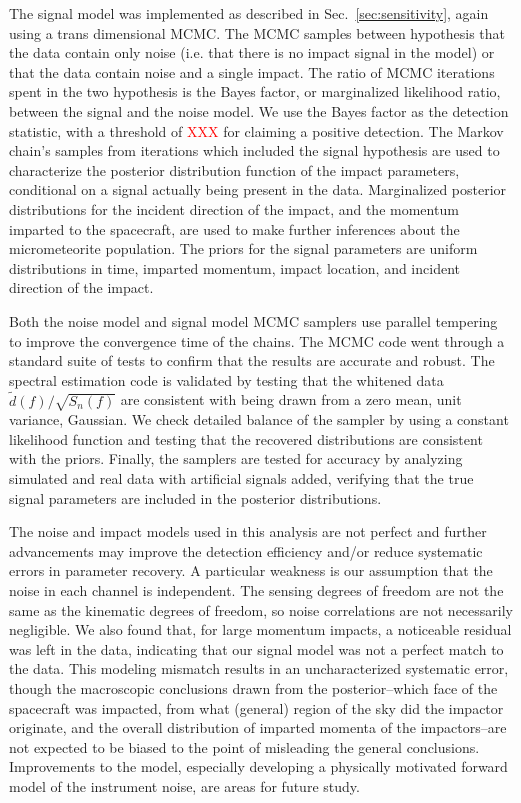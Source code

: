 \documentclass[twocolumn, trackchanges]{aastex61}
\newcommand{\red}[1]{\textcolor{red}{#1}}
\newcommand{\data}{\tilde d}
\begin{document}
The signal model was implemented as described in Sec.~\ref{sec:sensitivity}, again using a trans dimensional MCMC.
The MCMC samples between hypothesis that the data contain only noise (i.e. that there is no impact signal in the model) or that the data contain noise and a single impact.
The ratio of MCMC iterations spent in the two hypothesis is the Bayes factor, or marginalized likelihood ratio, between the signal and the noise model.
We use the Bayes factor as the detection statistic, with a threshold of \red{XXX} for claiming a positive detection.
The Markov chain's samples from iterations which included the signal hypothesis are used to characterize the posterior distribution function of the impact parameters, conditional on a signal actually being present in the data.
Marginalized posterior distributions for the incident direction of the impact, and the momentum imparted to the spacecraft, are used to make further inferences about the micrometeorite population.
The priors for the signal parameters are uniform distributions in time, imparted momentum, impact location, and incident direction of the impact.  

Both the noise model and signal model MCMC samplers use parallel tempering to improve the convergence time of the chains.
The MCMC code went through a standard suite of tests to confirm that the results are accurate and robust.
The spectral estimation code is validated by testing that the whitened data $\data(f)/\sqrt{S_n(f)}$ are consistent with being drawn from a zero mean, unit variance, Gaussian.
We check detailed balance of the sampler by using a constant likelihood function and testing that the recovered distributions are consistent with the priors.
Finally, the samplers are tested for accuracy by analyzing simulated and real data with artificial signals added, verifying that the true signal parameters are included in the posterior distributions.
 
The noise and impact models used in this analysis are not perfect and further advancements may improve the detection efficiency and/or reduce systematic errors in parameter recovery.
A particular weakness is our assumption that the noise in each channel is independent. 
The sensing degrees of freedom are not the same as the kinematic degrees of freedom, so noise correlations are not necessarily negligible. 
We also found that, for large momentum impacts, a noticeable residual was left in the data, indicating that our signal model was not a perfect match to the data. 
This modeling mismatch results in an uncharacterized systematic error, though the macroscopic conclusions drawn from the posterior--which face of the spacecraft was impacted, from what (general) region of the sky did the impactor originate, and the overall distribution of imparted momenta of the impactors--are not expected to be biased to the point of misleading the general conclusions.
Improvements to the model, especially developing a physically motivated forward model of the instrument noise, are areas for future study.
\end{document}
